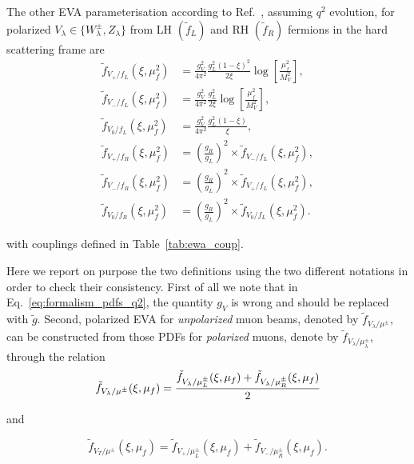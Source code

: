 \documentclass[a4paper,11pt]{article}
\begin{document}
The other EVA parameterisation  according to Ref.~\cite{Ruiz:2021tdt}, assuming $q^2$ evolution,
 for polarized $V_\lambda\in\{W_\lambda^\pm,Z_\lambda\}$ from LH $(\tilde{f}_L)$ and RH $(\tilde{f}_R)$ fermions in the hard scattering frame are 
\begin{subequations}
\label{eq:formalism_pdfs_q2}
\begin{align}
\tilde{f}_{V_+/f_L}(\xi,\mu_f^2) 	&= \frac{g_V^2}{4\pi^2} \frac{g_L^2(1-\xi)^2}{2\xi} \log \left[\frac{\mu_f^2}{M_V^2}\right], \\
\tilde{f}_{V_-/f_L}(\xi,\mu_f^2) 	&= \frac{g_V^2}{4\pi^2} \frac{g_L^2}{2\xi} \log \left[\frac{\mu_f^2}{M_V^2}\right], \\
\tilde{f}_{V_0 / f_L}(\xi,\mu_f^2) 	&= \frac{g_V^2}{4\pi^2} \frac{g_L^2(1-\xi)}{\xi},\\  
\tilde{f}_{V_+/f_R}(\xi,\mu_f^2) 	&= \left(\frac{g_R}{g_L}\right)^2 \times \tilde{f}_{V_-/f_L}(\xi,\mu_f^2), \\
\tilde{f}_{V_-/f_R}(\xi,\mu_f^2) 	&= \left(\frac{g_R}{g_L}\right)^2 \times \tilde{f}_{V_+/f_L}(\xi,\mu_f^2), \\
\tilde{f}_{V_0/f_R}(\xi,\mu_f^2) 	&= \left(\frac{g_R}{g_L}\right)^2 \times \tilde{f}_{V_0/f_L}(\xi,\mu_f^2). 
\end{align}
\end{subequations}

with couplings defined in Table~\ref{tab:ewa_coup}.

Here we report on purpose the two definitions using the two different notations in order to check their consistency.
First of all we note that in Eq.~\eqref{eq:formalism_pdfs_q2}, the quantity $g_V$ is wrong and should be replaced with $\tilde{g}$. Second,
polarized EVA for \textit{unpolarized} muon beams, denoted by $\tilde{f}_{V_\lambda/\mu^\pm}$, can be constructed from those PDFs for \textit{polarized} muons, denote by $\tilde{f}_{V_\lambda/\mu^\pm_\lambda}$, through the relation
\begin{equation}
 \tilde{f}_{V_\lambda/\mu^\pm}(\xi,\mu_f) =
 \cfrac{\tilde{f}_{V_\lambda/\mu^\pm_L}(\xi,\mu_f) + \tilde{f}_{V_\lambda/\mu^\pm_R}(\xi,\mu_f)}{2}
\label{eq:pdfDef_unpolarizedMuon}
\end{equation}

and 

\begin{equation}
 \tilde{f}_{V_T/\mu^\pm}(\xi,\mu_f) =
\tilde{f}_{V_+/\mu^\pm_L}(\xi,\mu_f) + \tilde{f}_{V_-/\mu^\pm_R}(\xi,\mu_f).
\label{eq:pdfDef_unpolarizedMuon}
\end{equation}
\end{document}
